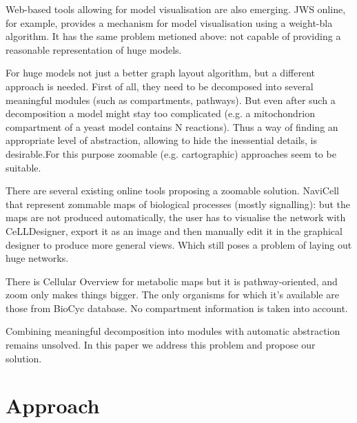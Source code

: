 \documentclass{bioinfo}
\begin{document}
Web-based tools allowing for model visualisation are also emerging.  JWS online, for example, provides a mechanism for model visualisation using a weight-bla algorithm. It has the same problem metioned above: not capable of providing a reasonable representation of huge models.

For huge models not just a better graph layout algorithm, but a different approach is needed. First of all, they need to be decomposed into several meaningful modules (such as compartments, pathways). But even after such a decomposition a model might stay too complicated (e.g. a mitochondrion compartment of a yeast model\cite{Heavner12} contains N reactions). Thus a way of finding an appropriate level of abstraction, allowing to hide the inessential details, is desirable.For this purpose zoomable (e.g. cartographic) approaches seem to be suitable. 

There are several existing online tools proposing a zoomable solution. NaviCell\cite{Kuperstein2013} that represent zommable maps of biological processes (mostly signalling): but the maps are not produced automatically, the user has to visualise the network with CeLLDesigner, export it as an image and then manually edit it in the graphical designer to produce more general views. Which still poses a problem of laying out huge networks. 

There is Cellular Overview\cite{Latendresse2011} for metabolic maps but it is pathway-oriented, and zoom only makes things bigger. The only organisms for which it's available are those from BioCyc database\cite{Caspi2012}. No compartment information is taken into account.

Combining meaningful decomposition into modules with automatic abstraction remains unsolved. In this paper we address this problem and propose our solution.

\section{Approach}
\end{document}
